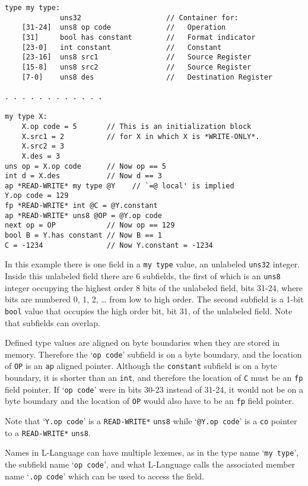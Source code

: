 \documentclass[12pt]{article}
\newenvironment{indpar}[1][0.3in]%
	{\begin{list}{}%
		     {\setlength{\itemsep}{0in}%
		      \setlength{\topsep}{0in}%
		      \setlength{\parsep}{1ex}%
		      \setlength{\labelwidth}{#1}%
		      \setlength{\leftmargin}{#1}%
		      \addtolength{\leftmargin}{\labelsep}}%
	 \item}%
	{\end{list}}
\begin{document}
\begin{indpar}\begin{verbatim}
type my type:
             uns32                    // Container for:
    [31-24]  uns8 op code             //   Operation
    [31]     bool has constant        //   Format indicator
    [23-0]   int constant             //   Constant
    [23-16]  uns8 src1                //   Source Register
    [15-8]   uns8 src2                //   Source Register
    [7-0]    uns8 des                 //   Destination Register

. . . . . . . . . . . .

my type X:
    X.op code = 5       // This is an initialization block
    X.src1 = 2          // for X in which X is *WRITE-ONLY*.
    X.src2 = 3
    X.des = 3
uns op = X.op code      // Now op == 5
int d = X.des           // Now d == 3
ap *READ-WRITE* my type @Y    // `=@ local' is implied
Y.op code = 129
fp *READ-WRITE* int @C = @Y.constant
ap *READ-WRITE* uns8 @OP = @Y.op code
next op = OP            // Now op == 129
bool B = Y.has constant // Now B == 1
C = -1234               // Now Y.constant = -1234
\end{verbatim}\end{indpar}

In this example there is one field in a {\tt my type} value,
an unlabeled {\tt uns32} integer.
Inside this unlabeled field there are 6 subfields, the first of which is
an {\tt uns8} integer occupying the highest order 8
bits of the unlabeled field, bits 31-24,
where bits are numbered 0, 1, 2, \ldots{} from
low to high order.  The second subfield is a 1-bit {\tt bool}
value that occupies the high order bit, bit 31, of the unlabeled field.
Note that subfields can overlap.

Defined type values are aligned on byte boundaries when
they are stored in memory.  Therefore the `{\tt op code}' subfield
is on a byte boundary, and
the location of {\tt OP} is an {\tt ap} aligned pointer.  Although
the {\tt constant} subfield is on a byte boundary, it is
shorter than an {\tt int}, and therefore the
location of {\tt C} must be an {\tt fp} field pointer.
If `{\tt op code}' were in bits 30-23 instead of 31-24, it would
not be on a byte boundary and the location of {\tt OP} would
also have to be an {\tt fp} field pointer.

Note that `{\tt Y.op code}' is a {\tt *READ-WRITE*}
{\tt uns8} while `{\tt @Y.op code}' is a {\tt co} pointer to
a {\tt *READ-WRITE*} {\tt uns8}.

Names in L-Language can have multiple lexemes, as in
the type name `{\tt my type}', the subfield name `{\tt op code}',
and what L-Language calls the
associated member name `{\tt .op code}' which can be used to access
the field.
\end{document}
